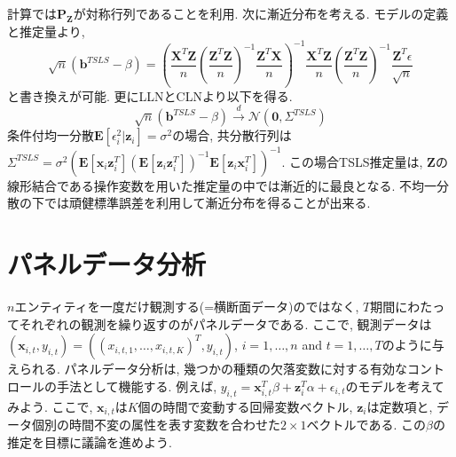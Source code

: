 \documentclass[paper=a4paper,fontsize=10pt]{jlreq}
\begin{document}
計算では$\mathbf{P_Z}$が対称行列であることを利用. 次に漸近分布を考える. モデルの定義と推定量より, 
\begin{equation*}
  \sqrt{n}(\mathbf{b}^{TSLS} - \beta) = (\frac{\mathbf{X}^T\mathbf{Z}}{n} (\frac{\mathbf{Z}^T\mathbf{Z}}{n})^{-1} \frac{\mathbf{Z}^T\mathbf{X}}{n})^{-1} \frac{\mathbf{X}^T\mathbf{Z}}{n} (\frac{\mathbf{Z}^T\mathbf{Z}}{n})^{-1} \frac{\mathbf{Z}^T\epsilon}{\sqrt{n}}
\end{equation*}
と書き換えが可能. 更にLLNとCLNより以下を得る.
\begin{equation*}
  \sqrt{n}(\mathbf{b}^{TSLS} - \beta) \overset{d}{\to} \mathcal{N}(\mathbf{0}, \Sigma^{TSLS})
\end{equation*}
条件付均一分散$\mathbf{E}[\epsilon_i^2|\mathbf{z}_i] = \sigma^2$の場合, 共分散行列は$\Sigma^{TSLS} = \sigma^2(\mathbf{E}[\mathbf{x}_i\mathbf{z}_i^T] (\mathbf{E}[\mathbf{z}_i\mathbf{z}_i^T])^{-1} \mathbf{E}[\mathbf{z}_i\mathbf{x}_i^T])^{-1}$. この場合TSLS推定量は, $\mathbf{Z}$の線形結合である操作変数を用いた推定量の中では漸近的に最良となる. 不均一分散の下では頑健標準誤差を利用して漸近分布を得ることが出来る.\\

\section{パネルデータ分析}
$n$エンティティを一度だけ観測する(=横断面データ)のではなく, $T$期間にわたってそれぞれの観測を繰り返すのがパネルデータである. ここで, 観測データは$(\mathbf{x}_{i,t}, y_{i,t}) = ((x_{i,t,1}, \dots, x_{i,t,K})^T, y_{i,t})$, $i=1,\dots,n$ and $t=1,\dots,T$のように与えられる. パネルデータ分析は, 幾つかの種類の欠落変数に対する有効なコントロールの手法として機能する. 例えば, $y_{i,t} = \mathbf{x}_{i,t}^T \beta + \mathbf{z}_{i}^T \alpha + \epsilon_{i,t}$のモデルを考えてみよう. ここで, $\mathbf{x}_{i,t}$は$K$個の時間で変動する回帰変数ベクトル, $\mathbf{z}_{i}$は定数項と, データ個別の時間不変の属性を表す変数を合わせた$2\times1$ベクトルである. この$\beta$の推定を目標に議論を進めよう.\\
\end{document}
